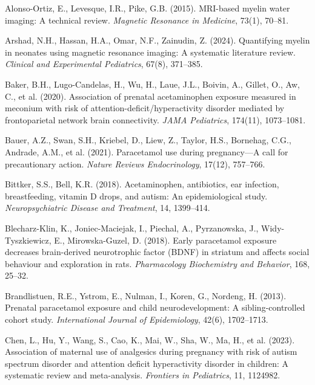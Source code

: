 \documentclass[11pt]{article}
\begin{document}
\begin{thebibliography}{99}

Alonso-Ortiz, E., Levesque, I.R., Pike, G.B. (2015).
MRI-based myelin water imaging: A technical review.
\textit{Magnetic Resonance in Medicine}, 73(1), 70--81.

Arshad, N.H., Hassan, H.A., Omar, N.F., Zainudin, Z. (2024).
Quantifying myelin in neonates using magnetic resonance imaging: A systematic literature review.
\textit{Clinical and Experimental Pediatrics}, 67(8), 371--385.


Baker, B.H., Lugo-Candelas, H., Wu, H., Laue, J.L., Boivin, A., Gillet, O., Aw, C., et al. (2020).
Association of prenatal acetaminophen exposure measured in meconium with risk of attention-deficit/hyperactivity disorder mediated by frontoparietal network brain connectivity.
\textit{JAMA Pediatrics}, 174(11), 1073--1081.

Bauer, A.Z., Swan, S.H., Kriebel, D., Liew, Z., Taylor, H.S., Bornehag, C.G., Andrade, A.M., et al. (2021).
Paracetamol use during pregnancy---A call for precautionary action.
\textit{Nature Reviews Endocrinology}, 17(12), 757--766.

Bittker, S.S., Bell, K.R. (2018).
Acetaminophen, antibiotics, ear infection, breastfeeding, vitamin D drops, and autism: An epidemiological study.
\textit{Neuropsychiatric Disease and Treatment}, 14, 1399--414.

Blecharz-Klin, K., Joniec-Maciejak, I., Piechal, A., Pyrzanowska, J., Widy-Tyszkiewicz, E., Mirowska-Guzel, D. (2018).
Early paracetamol exposure decreases brain-derived neurotrophic factor (BDNF) in striatum and affects social behaviour and exploration in rats.
\textit{Pharmacology Biochemistry and Behavior}, 168, 25--32.

Brandlistuen, R.E., Ystrom, E., Nulman, I., Koren, G., Nordeng, H. (2013).
Prenatal paracetamol exposure and child neurodevelopment: A sibling-controlled cohort study.
\textit{International Journal of Epidemiology}, 42(6), 1702--1713.

Chen, L., Hu, Y., Wang, S., Cao, K., Mai, W., Sha, W., Ma, H., et al. (2023).
Association of maternal use of analgesics during pregnancy with risk of autism spectrum disorder and attention deficit hyperactivity disorder in children: A systematic review and meta-analysis.
\textit{Frontiers in Pediatrics}, 11, 1124982.


\end{thebibliography}
\end{document}
